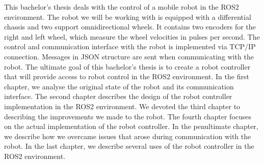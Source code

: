 This bachelor's thesis deals with the control of a mobile robot in the ROS2 environment. The robot we will
be working with is equipped with a differential chassis and two support omnidirectional wheels. It contains
two encoders for the right and left wheel, which measure the wheel velocities in pulses per second.
The control and communication interface with the robot is implemented via TCP/IP connection. Messages
in JSON structure are sent when communicating with the robot.
The ultimate goal of this bachelor's thesis is to create a robot controller that will provide access
to robot control in the ROS2 environment. In the first chapter, we analyse the original state
of the robot and its communication interface. The second chapter describes the design of the robot
controller implementation in the ROS2 environment. We devoted the third chapter to describing
the improvements we made to the robot. The fourth chapter focuses on the actual implementation
of the robot controller. In the penultimate chapter, we describe how we overcame issues that arose
during communication with the robot. In the last chapter, we describe several uses of the robot
controller in the ROS2 environment.
